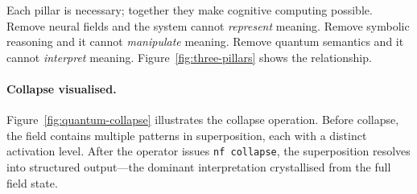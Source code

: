 Each pillar is necessary; together they make cognitive computing
possible.  Remove neural fields and the system cannot \emph{represent}
meaning.  Remove symbolic reasoning and it cannot \emph{manipulate}
meaning.  Remove quantum semantics and it cannot \emph{interpret}
meaning.  Figure~\ref{fig:three-pillars} shows the relationship.

\paragraph{Collapse visualised.}
Figure~\ref{fig:quantum-collapse} illustrates the collapse operation.
Before collapse, the field contains multiple patterns in superposition,
each with a distinct activation level.  After the operator issues
\texttt{nf collapse}, the superposition resolves into structured
output---the dominant interpretation crystallised from the full field
state.


